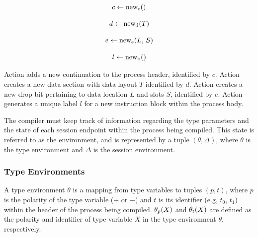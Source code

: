 \begin{minipage}{0.45\textwidth}\begin{equation}c \leftarrow \text{new}_{\text{c}}()\label{eq:makecont}\end{equation}\end{minipage}
\hfill
\begin{minipage}{0.45\textwidth}\begin{equation}d \leftarrow \text{new}_{\text{d}}(T)\label{eq:makedata}\end{equation}\end{minipage}

\begin{minipage}{0.45\textwidth}\begin{equation}e \leftarrow \text{new}_{\text{e}}(L,\,S)\label{eq:makedrop}\end{equation}\end{minipage}
\hfill
\begin{minipage}{0.45\textwidth}\begin{equation}l \leftarrow \text{new}_{\text{b}}()\label{eq:makeblock}\end{equation}\end{minipage}

Action  adds a new continuation to the process header, identified by $c$. Action  creates a new data section with data layout $T$ identified by $d$. Action  creates a new drop bit pertaining to data location $L$ and slots $S$, identified by $e$. Action  generates a unique label $l$ for a new instruction block within the process body.

The compiler must keep track of information regarding the type parameters and the state of each session endpoint within the process being compiled. This state is referred to as the environment, and is represented by a tuple $(\theta, \Delta)$, where $\theta$ is the type environment and $\Delta$ is the session environment.

\subsubsection{Type Environments} \label{subsubsection:TypeEnvironments}

A type environment $\theta$ is a mapping from type variables to tuples $(p, t)$, where $p$ is the polarity of the type variable ($+$ or $-$) and $t$ is its identifier (e.g, $t_0$, $t_1$) within the header of the process being compiled. $\theta_{p}(X)$ and $\theta_{t}(X)$ are defined as the polarity and identifier of type variable $X$ in the type environment $\theta$, respectively.

